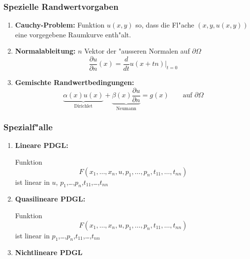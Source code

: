 \documentclass{beamer}
\begin{document}
\begin{frame}
\frametitle{Spezielle Randwertvorgaben}
\begin{enumerate}
\item {\bf Cauchy-Problem:}
\pause
Funktion $u(x,y)$ so, dass die Fl"ache $(x,y,u(x,y))$ eine vorgegebene
Raumkurve enth"alt.
\medskip

\pause
\item {\bf Normalableitung:}
\pause
$n$ Vektor der "ausseren Normalen auf $\partial\Omega$
\[
\frac{\partial u}{\partial n}(x)
=
\frac{d}{dt}u(x+tn)\bigg|_{t=0}
\]
\pause
\item {\bf Gemischte Randwertbedingungen:}
\pause
\[
\underbrace{
\alpha(x) u(x)
}_{\text{Dirichlet}}
+
\underbrace{
\beta(x)\frac{\partial u}{\partial n}
}_{\text{Neumann}}
= g(x) 
\qquad
\text{auf $\partial\Omega$}
\]
\end{enumerate}
\end{frame}

\begin{frame}
\frametitle{Spezialf"alle}
\begin{enumerate}
\item {\bf Lineare PDGL:}

\pause
Funktion
\[
F(x_1,\dots,x_n,u,p_1,\dots,p_n,t_{11},\dots,t_{nn})
\]
ist linear in {\color{red}$u$}, $p_1$,\dots,$p_n$,$t_{11}$,\dots,$t_{nn}$
\pause
\item {\bf Quasilineare PDGL:}

\pause
Funktion
\[
F(x_1,\dots,x_n,u,p_1,\dots,p_n,t_{11},\dots,t_{nn})
\]
ist linear in $p_1$,\dots,$p_n$,$t_{11}$,\dots,$t_{nn}$
\pause
\item {\bf Nichtlineare PDGL}
\end{enumerate}
\end{frame}
\end{document}
